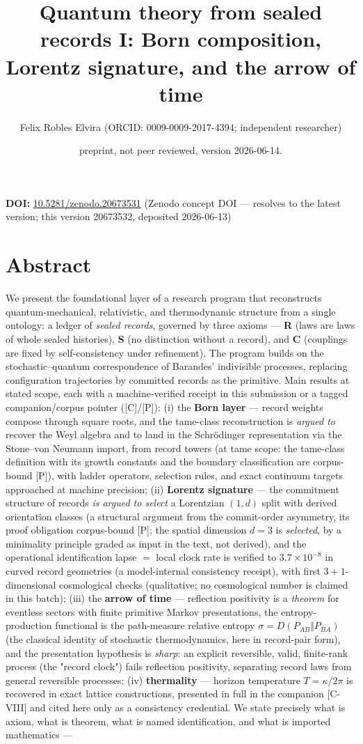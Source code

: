 \documentclass[11pt]{article}
\title{Quantum theory from sealed records I: Born composition, Lorentz signature, and the arrow of time}
\author{Felix Robles Elvira (ORCID: 0009-0009-2017-4394; independent researcher)}
\date{\small preprint, not peer reviewed, version 2026-06-14.}
\begin{document}
\maketitle

\textbf{DOI:} \href{https://doi.org/10.5281/zenodo.20673531}{10.5281/zenodo.20673531} (Zenodo concept DOI — resolves to the latest version; this version 20673532, deposited 2026-06-13)

\section*{Abstract}
We present the foundational layer of a research program that reconstructs quantum-mechanical, relativistic, and thermodynamic structure from a single ontology: a ledger of \emph{sealed records}, governed by three axioms — \textbf{R} (laws are laws of whole sealed histories), \textbf{S} (no distinction without a record), and \textbf{C} (couplings are fixed by self-consistency under refinement).  The program builds on the stochastic–quantum correspondence of Barandes' indivisible processes, replacing configuration trajectories by committed records as the primitive.  Main results at stated scope, each with a machine-verified receipt in this submission or a tagged companion/corpus pointer ([C]/[P]): (i) the \textbf{Born layer} — record weights compose through square roots, and the tame-class reconstruction is \emph{argued to} recover the Weyl algebra and to land in the Schrödinger representation via the Stone–von Neumann import, from record towers (at tame scope: the tame-class definition with its growth constants and the boundary classification are corpus-bound [P]), with ladder operators, selection rules, and exact continuum targets approached at machine precision; (ii) \textbf{Lorentz signature} — the commitment structure of records \emph{is argued to select} a Lorentzian $(1,d)$ split with derived orientation classes (a structural argument from the commit-order asymmetry, its proof obligation corpus-bound [P]; the spatial dimension $d = 3$ is \emph{selected}, by a minimality principle graded as input in the text, not derived), and the operational identification lapse $=$ local clock rate is verified to $3.7\times 10^{-8}$ in curved record geometries (a model-internal consistency receipt), with first $3{+}1$-dimensional cosmological checks (qualitative; no cosmological number is claimed in this batch); (iii) the \textbf{arrow of time} — reflection positivity is a \emph{theorem} for eventless sectors with finite primitive Markov presentations, the entropy-production functional is the path-measure relative entropy $\sigma = D(P_{AB}\Vert P_{BA})$ (the classical identity of stochastic thermodynamics, here in record-pair form), and the presentation hypothesis is \emph{sharp}: an explicit reversible, valid, finite-rank process (the "record clock") fails reflection positivity, separating record laws from general reversible processes; (iv) \textbf{thermality} — horizon temperature $T = \kappa/2\pi$ is recovered in exact lattice constructions, presented in full in the companion [C-VIII] and cited here only as a consistency credential.  We state precisely what is axiom, what is theorem, what is named identification, and what is imported mathematics — 
\end{document}
